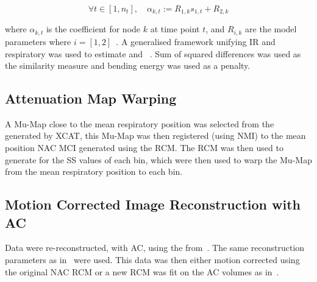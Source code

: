         \vspace{-0.25cm}
        
        \begin{equation}
            \forall t \in [1, n_t],\quad \alpha_{k, t} := R_{1, k} s_{1, t} + R_{2, k}
        \end{equation}
        
        \vspace{-0.025cm}
        
        \noindent where $\alpha_{k, t}$ is the coefficient for node $k$ at time point $t$, and $R_{i, k}$ are the model parameters where $i = [1, 2]$~\cite{McClelland2017}. A generalised framework unifying \gls{IR} and respiratory  was used to estimate  and ~\cite{McClelland2017}. Sum of squared differences was used as the similarity measure and bending energy was used as a penalty.%
    
    \vspace{-0.5cm}
    
    \subsection{Attenuation Map Warping} \label{sec:attenuation_map_warping}
        A \gls{Mu-Map} close to the mean respiratory position was selected from the  generated by \gls{XCAT}, this \gls{Mu-Map} was then registered (using \gls{NMI}) to the mean position \gls{NAC} \gls{MCI} generated using the \gls{RCM}.
        The \gls{RCM} was then used to generate  for the \gls{SS} values of each bin, which were then used to warp the \gls{Mu-Map} from the mean respiratory position to each bin.
    
    \vspace{-0.5cm}
    
    \subsection{Motion Corrected Image Reconstruction with AC} \label{sec:attenuation_corrected_image_reconstruction}
        Data were re-reconstructed, with \gls{AC}, using the  from~. The same reconstruction parameters as in~ were used. This data was then either motion corrected using the original \gls{NAC} \gls{RCM} or a new \gls{RCM} was fit on the \gls{AC} volumes as in~.
    
